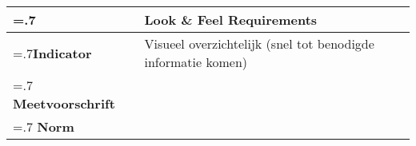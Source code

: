 \noindent
\begin{longtable}{|>{\raggedleft\hsize=.7\hsize\bfseries}X|
    >{\arraybackslash\hsize=1.3\hsize}X|} \hline
\multicolumn{1}{|l|}{\textbf{NFR}} & Look \& Feel Requirements\\ \hline
Indicator & Visueel overzichtelijk (snel tot benodigde informatie komen) \\  \hline
Meetvoorschrift & \\ \hline
Norm & \\ \hline
\end{longtable}